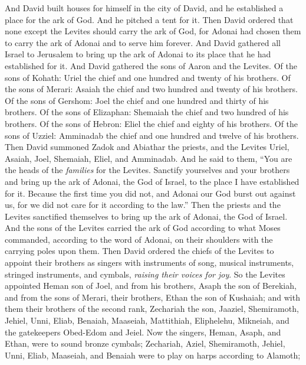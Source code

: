 \begin{biblechapter} %
 And David built houses for himself in the city of David, and he established a place for the ark of God. And he pitched a tent for it.
\verse Then David ordered that none except the Levites should carry the ark of God, for Adonai had chosen them to carry the ark of Adonai and to serve him forever.
\verse And David gathered all Israel to Jerusalem to bring up the ark of Adonai to its place that he had established for it.
\verse And David gathered the sons of Aaron and the Levites.
\verse Of the sons of Kohath: Uriel the chief and one hundred and twenty of his brothers.
\verse Of the sons of Merari: Asaiah the chief and two hundred and twenty of his brothers.
\verse Of the sons of Gershom: Joel the chief and one hundred and thirty of his brothers.
\verse Of the sons of Elizaphan: Shemaiah the chief and two hundred of his brothers.
\verse Of the sons of Hebron: Eliel the chief and eighty of his brothers.
\verse Of the sons of Uzziel: Amminadab the chief and one hundred and twelve of his brothers.
\verse Then David summoned Zadok and Abiathar the priests, and the Levites Uriel, Asaiah, Joel, Shemaiah, Eliel, and Amminadab.
\verse And he said to them, “You are the heads of the \textit{families} for the Levites. Sanctify yourselves and your brothers and bring up the ark of Adonai, the God of Israel, to the place I have established for it.
\verse Because the first time you did not, and Adonai our God burst out against us, for we did not care for it according to the law.”
\verse Then the priests and the Levites sanctified themselves to bring up the ark of Adonai, the God of Israel.
\verse And the sons of the Levites carried the ark of God according to what Moses commanded, according to the word of Adonai, on their shoulders with the carrying poles upon them.
\verse Then David ordered the chiefs of the Levites to appoint their brothers as singers with instruments of song, musical instruments, stringed instruments, and cymbals, \textit{raising their voices for joy}.
\verse So the Levites appointed Heman son of Joel, and from his brothers, Asaph the son of Berekiah, and from the sons of Merari, their brothers, Ethan the son of Kushaiah;
\verse and with them their brothers of the second rank, Zechariah the son, Jaaziel, Shemiramoth, Jehiel, Unni, Eliab, Benaiah, Maaseiah, Mattithiah, Eliphelehu, Mikneiah, and the gatekeepers Obed-Edom and Jeiel.
\verse Now the singers, Heman, Asaph, and Ethan, were to sound bronze cymbals;
\verse Zechariah, Aziel, Shemiramoth, Jehiel, Unni, Eliab, Maaseiah, and Benaiah were to play on harps according to Alamoth;

\end{biblechapter}
